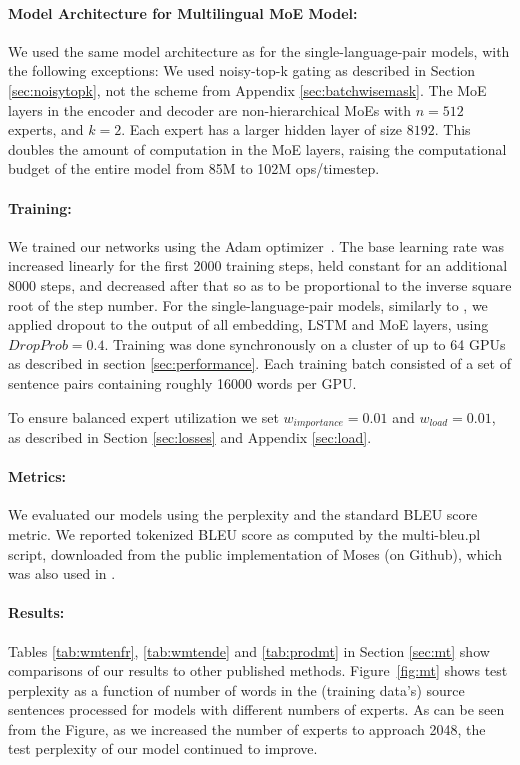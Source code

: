 \documentclass{article}
\begin{document}
\paragraph{Model Architecture for Multilingual MoE Model:} We used the same model architecture as for the single-language-pair models, with the following exceptions:  We used noisy-top-k gating as described in Section \ref{sec:noisytopk}, not the scheme from Appendix \ref{sec:batchwisemask}.  The MoE layers in the encoder and decoder are non-hierarchical MoEs with $n=512$ experts, and $k=2$.  Each expert has a larger hidden layer of size $8192$.  This doubles the amount of computation in the MoE layers, raising the computational budget of the entire model from 85M to 102M ops/timestep.

\paragraph{Training:} We trained our networks using the Adam optimizer~\citep{kingma2014adam}. The base learning rate was increased linearly for the first 2000 training steps, held constant for an additional 8000 steps, and decreased after that so as to be proportional to the inverse square root of the step number.  For the single-language-pair models, similarly to \citep{GNMT}, we applied dropout \citep{ZarembaSV14} to the output of all embedding, LSTM and MoE layers, using $DropProb=0.4$.  Training was done synchronously on a cluster of up to 64 GPUs as described in section \ref{sec:performance}.  Each training batch consisted of a set of sentence pairs containing roughly 16000 words per GPU.

To ensure balanced expert utilization we set $w_{importance}=0.01$ and $w_{load}=0.01$, as described in Section \ref{sec:losses} and Appendix \ref{sec:load}.

\paragraph{Metrics:} We evaluated our models using the perplexity and the standard BLEU score metric. We reported tokenized BLEU score as computed by the multi-bleu.pl script, downloaded from the public implementation of Moses (on Github), which was also used in \citep{LuongPM:2015:EAANMT}. 

\paragraph{Results:} Tables \ref{tab:wmtenfr}, \ref{tab:wmtende} and \ref{tab:prodmt} in Section \ref{sec:mt} show comparisons of our results to other published methods.  Figure~\ref{fig:mt} shows test perplexity as a function of number of words in the (training data's) source sentences processed for models with different numbers of experts.  As can be seen from the Figure, as we increased the number of experts to approach 2048, the test perplexity of our model continued to improve. 
\end{document}
